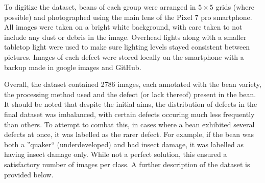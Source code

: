 To digitize the dataset, beans of each group were arranged in $5 \times 5$ grids
(where possible) and photographed using the main lens of the Pixel 7 pro smartphone.
All images were taken on a bright white background, with care taken to not include any dust or debris in the image.
Overhead lights along with a smaller tabletop light were used to make sure lighting levels stayed consistent between pictures.
Images of each defect were stored locally on the smartphone with a backup made
in google images and GitHub.

Overall, the dataset contained 2786 images, each annotated with the bean variety,
the processing method used and the defect (or lack thereof) present in the bean.
It should be noted that despite the initial aims, the distribution of defects in
the final dataset was imbalanced, with certain defects occuring much less
frequently than others.
To attempt to combat this, in cases where a bean
exhibited several defects at once, it was labelled as the rarer defect.
For
example, if the bean was both a ''quaker`` (underdeveloped) and had insect damage,
it was labelled as having insect damage only.
While not a perfect solution, this
ensured a satisfactory number of images per class.
A further description of the dataset
is provided below.

